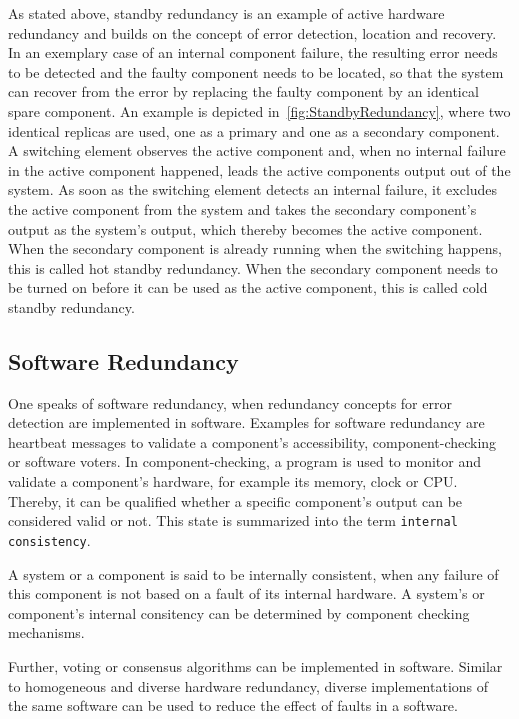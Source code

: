 As stated above, standby redundancy is an example of active hardware redundancy and builds on the concept of error detection, location and recovery.
In an exemplary case of an internal component failure, the resulting error needs to be detected and the faulty component needs to be located, so that the system can recover from the error by replacing the faulty component by an identical spare component.
An example is depicted in~\autoref{fig:StandbyRedundancy}, where two identical replicas are used, one as a primary and one as a secondary component.
A switching element observes the active component and, when no internal failure in the active component happened, leads the active components output out of the system.
As soon as the switching element detects an internal failure, it excludes the active component from the system and takes the secondary component's output as the system's output, which thereby becomes the active component.
When the secondary component is already running when the switching happens, this is called hot standby redundancy.
When the secondary component needs to be turned on before it can be used as the active component, this is called cold standby redundancy.

\subsection{Software Redundancy}
One speaks of software redundancy, when redundancy concepts for error detection are implemented in software.
Examples for software redundancy are heartbeat messages to validate a component's accessibility, component-checking or software voters.
In component-checking, a program is used to monitor and validate a component's hardware, for example its memory, clock or \gls*{CPU}.
Thereby, it can be qualified whether a specific component's output can be considered valid or not.
This state is summarized into the term \texttt{internal consistency}.

\begin{definition}
A system or a component is said to be internally consistent, when any failure of this component is not based on a fault of its internal hardware.
A system's or component's internal consitency can be determined by component checking mechanisms.
\end{definition}

Further, voting or consensus algorithms can be implemented in software.
Similar to homogeneous and diverse hardware redundancy, diverse implementations of the same software can be used to reduce the effect of faults in a software.

